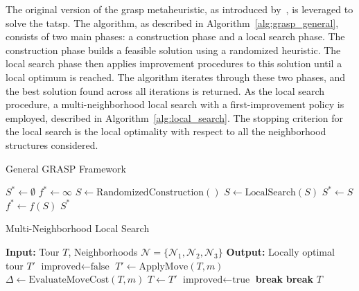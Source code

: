 \documentclass[twocolumn, switch]{article} %
\begin{document}
The original version of the \gls{grasp} metaheuristic, as introduced by~\cite{Feo1995}, is leveraged to solve the \gls{tatsp}. 
The algorithm, as described in Algorithm~\ref{alg:grasp_general}, consists of two main phases: a construction phase and a local search phase.
The construction phase builds a feasible solution using a randomized heuristic. The local search phase then applies improvement procedures to this solution until a local optimum is reached.
The algorithm iterates through these two phases, and the best solution found across all iterations is returned.
As the local search procedure, a multi-neighborhood local search with a first-improvement policy is employed, described in Algorithm~\ref{alg:local_search}.
The stopping criterion for the local search is the local optimality with respect to all the neighborhood structures considered.

\begin{algorithm}
\caption{General GRASP Framework}
\label{alg:grasp_general}
\begin{algorithmic}[1]
\State $S^* \leftarrow \emptyset$ 
\State $f^* \leftarrow \infty$ 
    \State $S \leftarrow \text{RandomizedConstruction}()$
    \State $S \leftarrow \text{LocalSearch}(S)$
        \State $S^* \leftarrow S$
        \State $f^* \leftarrow f(S)$
    \EndIf
\EndFor
\State \Return $S^*$
\end{algorithmic}
\end{algorithm}


\begin{algorithm}
\caption{Multi-Neighborhood Local Search}
\label{alg:local_search}
\begin{algorithmic}[1]
\State \textbf{Input:} Tour $T$, Neighborhoods $\mathcal{N} = \{\mathcal{N}_1, \mathcal{N}_2, \mathcal{N}_3\}$
\State \textbf{Output:} Locally optimal tour $T'$
\Repeat
    \State $\text{improved} \leftarrow \text{false}$
            \State $T' \leftarrow \text{ApplyMove}(T, m)$
            \State $\Delta \leftarrow \text{EvaluateMoveCost}(T, m)$ 
                \State $T \leftarrow T'$
                \State $\text{improved} \leftarrow \text{true}$
                \State \textbf{break} 
            \EndIf
        \EndFor
            \State \textbf{break} 
        \EndIf
    \EndFor
{}
\State \Return $T$
\end{algorithmic}
\end{algorithm}
\end{document}
